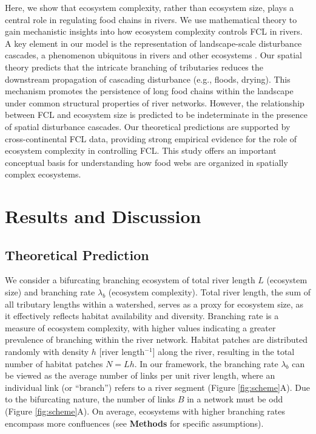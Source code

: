\documentclass[11pt, class=article, crop=false]{standalone}
\begin{document}
Here, we show that ecosystem complexity, rather than ecosystem size, plays a central role in regulating food chains in rivers.
We use mathematical theory to gain mechanistic insights into how ecosystem complexity controls FCL in rivers.
A key element in our model is the representation of landscape-scale disturbance cascades, a phenomenon ubiquitous in rivers \citep{swanson_flood_1998, nakamura_disturbance_2000, sarremejane_drought_2021} and other ecosystems \citep{connell_30year_1997, cansler_climate_2014}.
Our spatial theory predicts that the intricate branching of tributaries reduces the downstream propagation of cascading disturbance (e.g., floods, drying).
This mechanism promotes the persistence of long food chains within the landscape under common structural properties of river networks.
However, the relationship between FCL and ecosystem size is predicted to be indeterminate in the presence of spatial disturbance cascades.
Our theoretical predictions are supported by cross-continental FCL data, providing strong empirical evidence for the role of ecosystem complexity in controlling FCL.
This study offers an important conceptual basis for understanding how food webs are organized in spatially complex ecosystems.

\section{Results and Discussion}

\subsection{Theoretical Prediction}

We consider a bifurcating branching ecosystem of total river length $L$ (ecosystem size) and branching rate $\lambda_b$ (ecosystem complexity).
Total river length, the sum of all tributary lengths within a watershed, serves as a proxy for ecosystem size, as it effectively reflects habitat availability and diversity.
Branching rate is a measure of ecosystem complexity, with higher values indicating a greater prevalence of branching within the river network.
Habitat patches are distributed randomly with density $h$ [river length$^{-1}$] along the river, resulting in the total number of habitat patches $N = Lh$.
In our framework, the branching rate $\lambda_b$ can be viewed as the average number of links per unit river length, where an individual link (or ``branch'') refers to a river segment (Figure \ref{fig:scheme}A).
Due to the bifurcating nature, the number of links $B$ in a network must be odd (Figure \ref{fig:scheme}A).
On average, ecosystems with higher branching rates encompass more confluences (see \textbf{Methods} for specific assumptions).
\end{document}
